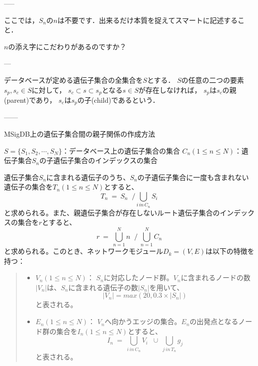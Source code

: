 \documentclass[a4paper,12pt]{jsreport}
\begin{document}
-----

ここでは，$S_n$の$n$は不要です．出来るだけ本質を捉えてスマートに記述すること．

$n$の添え字にこだわりがあるのですか？

---

データベースが定める遺伝子集合の全集合を$S$とする．
$S$の任意の二つの要素
$s_p, s_c \in S$に対して，
$s_c \subset s \subset s_p$となる$s \in S$が存在しなければ，
$s_p$は$s_c$の親(parent)であり，
$s_c$は$s_p$の子(child)であるという．


------

 
 
 \begin{algorithm}[H]
 \caption{MSigDB上の遺伝子集合間の親子関係の作成方法}
 \begin{algorithmic}[1]
 \renewcommand{\algorithmicrequire}{\textbf{Input:}}
 \renewcommand{\algorithmicensure}{\textbf{Output:}}
 \REQUIRE $S = \{S_1, S_2, \cdots, S_N\}$：データベース上の遺伝子集合の集合
 \ENSURE  $C_n(1\leq n\leq N)$：遺伝子集合$S_n$の子遺伝子集合のインデックスの集合
 \ENDIF
 \ENDFOR
 \ENDFOR
 \end{algorithmic} 
 \end{algorithm}


遺伝子集合$S_n$に含まれる遺伝子のうち、$S_n$の子遺伝子集合に一度も含まれない遺伝子の集合を$T_n(1\leq n\leq N)$とすると、
　$$T_n \: = \: S_n \; \; / \bigcup_{i\, in\, C_n} \! S_i$$
と求められる。また、親遺伝子集合が存在しないルート遺伝子集合のインデックスの集合を$r$とすると、
　$$r \: = \: \bigcup_{n=1}^{N} n \; \; / \;  \bigcup_{n=1}^{N} C_n$$
と求められる。このとき、ネットワークモジュール$D_k = (V, E)$は以下の特徴を持つ：

  \begin{quote}
  \begin{itemize}
  \item $V_n(1\leq n\leq N)$： $S_n$に対応したノード群。$V_n$に含まれるノードの数$|V_n|$は、$S_n$に含まれる遺伝子の数$|S_n|$を用いて、$$|V_n| = max(20, 0.3 \times |S_n|)$$と表される。
  \item $E_n(1\leq n\leq N)$： $V_n$へ向かうエッジの集合。$E_n$の出発点となるノード群の集合を$I_n(1\leq n\leq N)$とすると、$$I_n \: = \: \bigcup_{i\, in\, C_n} \! V_i \; \; \cup \;  \bigcup_{j\, in\, T_n} g_j$$と表される。
  \end{itemize}
  \end{quote}
 
\end{document}
